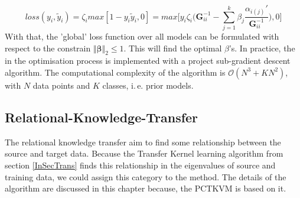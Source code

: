 \begin{equation}
	loss(y_i,\tilde{y}_i)= \zeta_i max[1-y_i\tilde{y}_i,0] = max \bigg[y_i\zeta_i\bigg({\mathbf{G}^{-1}_{ii}} - \sum_{j=1}^{k}\beta_j \frac{\alpha_{i(j)}'}{\mathbf{G}^{-1}_{ii}}\bigg),0\bigg]
\end{equation}
With that, the 'global' loss function over all models can be formulated with respect to the constrain $\Vert\boldsymbol{\beta}\Vert_2\le 1$.
This will find the optimal $\beta$'s.
In practice, the in the optimisation process is implemented with a project sub-gradient descent algorithm.\cite{Tommasi.}
The computational complexity of the algorithm is $\mathcal{O}(N^3+KN^2)$, with $N$ data points and $K$ classes, i.\,e. prior models.
\subsection{Relational-Knowledge-Transfer}\label{TlSubSecRelation}
The relational knowledge transfer aim to find some relationship between the source and target data.\cite[p. 7]{Weiss.2016}
Because the Transfer Kernel learning algorithm from section \ref{InSecTrans} finds this relationship in the eigenvalues of source and training data, we could assign this category to the method.
The details of the algorithm are discussed in this chapter because, the \acl{PCTKVM} is based on it.
